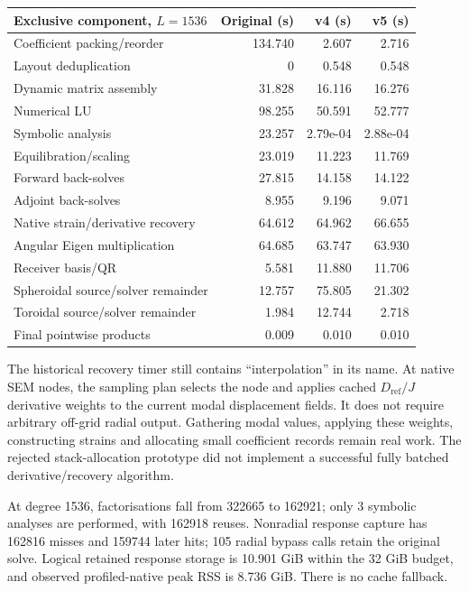 \documentclass[11pt,a4paper]{article}
\begin{document}
\begin{center}
\small
\begin{tabular}{p{8.2cm}rrr}
\toprule
Exclusive component, $L=1536$ & Original (s) & v4 (s) & v5 (s) \\
\midrule
Coefficient packing/reorder & 134.740 & 2.607 & 2.716 \\
Layout deduplication & 0 & 0.548 & 0.548 \\
Dynamic matrix assembly & 31.828 & 16.116 & 16.276 \\
Numerical LU & 98.255 & 50.591 & 52.777 \\
Symbolic analysis & 23.257 & 2.79e-04 & 2.88e-04 \\
Equilibration/scaling & 23.019 & 11.223 & 11.769 \\
Forward back-solves & 27.815 & 14.158 & 14.122 \\
Adjoint back-solves & 8.955 & 9.196 & 9.071 \\
Native strain/derivative recovery & 64.612 & 64.962 & 66.655 \\
Angular Eigen multiplication & 64.685 & 63.747 & 63.930 \\
Receiver basis/QR & 5.581 & 11.880 & 11.706 \\
Spheroidal source/solver remainder & 12.757 & 75.805 & 21.302 \\
Toroidal source/solver remainder & 1.984 & 12.744 & 2.718 \\
Final pointwise products & 0.009 & 0.010 & 0.010 \\
\bottomrule
\end{tabular}
\end{center}
The historical recovery timer still contains ``interpolation'' in its name. At native SEM nodes, the sampling plan selects the node and applies cached $D_\mathrm{ref}/J$ derivative weights to the current modal displacement fields. It does not require arbitrary off-grid radial output. Gathering modal values, applying these weights, constructing strains and allocating small coefficient records remain real work. The rejected stack-allocation prototype did not implement a successful fully batched derivative/recovery algorithm.

At degree 1536, factorisations fall from 322665 to 162921; only 3 symbolic analyses are performed, with 162918 reuses. Nonradial response capture has 162816 misses and 159744 later hits; 105 radial bypass calls retain the original solve. Logical retained response storage is 10.901 GiB within the 32 GiB budget, and observed profiled-native peak RSS is 8.736 GiB. There is no cache fallback.
\end{document}
